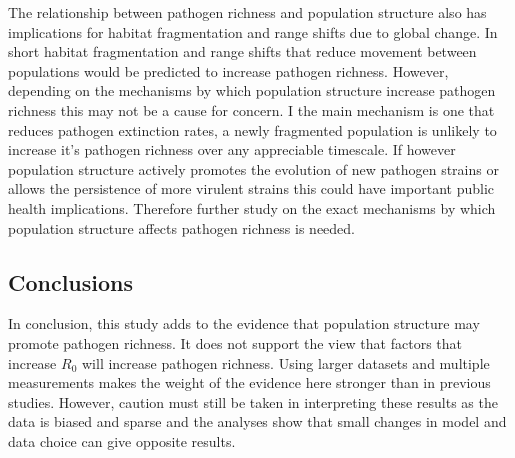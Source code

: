 The relationship between pathogen richness and population structure also has implications for habitat fragmentation and range shifts due to global change.
In short habitat fragmentation and range shifts that reduce movement between populations would be predicted to increase pathogen richness.
However, depending on the mechanisms by which population structure increase pathogen richness this may not be a cause for concern.
I the main mechanism is one that reduces pathogen extinction rates, a newly fragmented population is unlikely to increase it's pathogen richness over any appreciable timescale.
If however population structure actively promotes the evolution of new pathogen strains or allows the persistence of more virulent strains this could have important public health implications.
Therefore further study on the exact mechanisms by which population structure affects pathogen richness is needed. 

\subsection{Conclusions}

In conclusion, this study adds to the evidence that population structure may promote pathogen richness.
It does not support the view that factors that increase $R_0$ will increase pathogen richness.
Using larger datasets and multiple measurements makes the weight of the evidence here stronger than in previous studies.
However, caution must still be taken in interpreting these results as the data is biased and sparse and the analyses show that small changes in model and data choice can give opposite results.






















